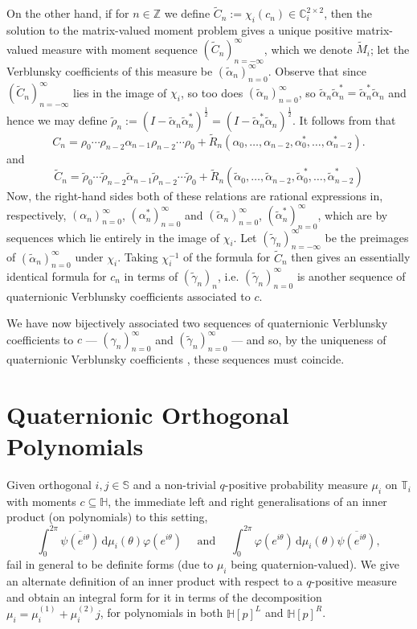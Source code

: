 \documentclass[11pt,reqno]{amsart}
\def\a{\alpha}
\def\x{\chi}
\def\p{\varphi}
\def\q{\psi}
\def\g{\gamma}
\def\r{\rho}
\def\th{\theta}
\def\rmd{\mathrm{d}}
\def\ZZ{\mathbb{Z}}
\def\CC{\mathbb{C}}
\def\SS{\mathbb{S}}
\def\TT{\mathbb{T}}
\def\HH{\mathbb{H}}
\theoremstyle{definition}
\numberwithin{equation}{section}
\renewcommand{\tilde}{\widetilde}
\begin{document}
On the other hand, if for \(n\in\ZZ\) we define \(\tilde{C}_n := \x_i(c_n) \in \CC_i^{2\times 2}\), then the solution to the matrix-valued moment problem gives a unique positive matrix-valued measure with moment sequence \((\tilde{C}_n)_{n=-\infty}^{\infty}\), which we denote \(\tilde{M}_i\); let the Verblunsky coefficients of this measure be \((\tilde{\a}_n)_{n=0}^{\infty}\). Observe that since \((\tilde{C}_n)_{n=-\infty}^{\infty}\) lies in the image of \(\x_i\), so too does \((\tilde{\a}_n)_{n=0}^{\infty}\), so \(\tilde{\a}_n \tilde{\a}_n^* = \tilde{\a}_n^* \tilde{\a}_n\) and hence we may define \(\tilde{\r}_n := (I - \tilde{\a}_n \tilde{\a}_n^*)^{\frac12} = (I - \tilde{\a}_n^* \tilde{\a}_n)^{\frac12}\). It follows from  that
\[
    C_{n} = \r_0 \cdots \r_{n-2} \a_{n-1} \r_{n-2} \cdots \r_0 + \tilde{R}_{n}(\a_0, \ldots, \a_{n-2}, \a_0^*, \ldots, \a_{n-2}^*).
\]
and
\[
    \tilde{C}_n = \tilde{\r}_0 \cdots \tilde{\r}_{n-2} \tilde{\a}_{n-1} \tilde{\r}_{n-2} \cdots \tilde{\r}_0 + \tilde{R}_{n}(\tilde{\a}_0, \ldots, \tilde{\a}_{n-2}, \tilde{\a}_0^*, \ldots, \tilde{\a}_{n-2}^*)
\]
Now, the right-hand sides both of these relations are rational expressions in, respectively, \((\a_n)_{n=0}^{\infty}\), \((\a_n^*)_{n=0}^{\infty}\) and \((\tilde{\a}_n)_{n=0}^{\infty}\), \((\tilde{\a}_n^*)_{n=0}^{\infty}\), which are by  sequences which lie entirely in the image of \(\x_i\). Let \((\tilde{\g}_n)_{n=-\infty}^{\infty}\) be the preimages of \((\tilde{\a}_n)_{n=0}^{\infty}\) under \(\x_i\). Taking \(\x_i^{-1}\) of the formula for \(\tilde{C}_n\) then gives an essentially identical formula for \(c_n\) in terms of \((\tilde{\g}_n)_n\), i.e. \((\tilde{\g}_n)_{n=0}^{\infty}\) is another sequence of quaternionic Verblunsky coefficients associated to \(c\).

We have now bijectively associated two sequences of quaternionic Verblunsky coefficients to \(c\) --- \((\g_n)_{n=0}^{\infty}\) and \((\tilde{\g}_n)_{n=0}^{\infty}\) --- and so, by the uniqueness of quaternionic Verblunsky coefficients \cite{ACS16a}, these sequences must coincide.

\section{Quaternionic Orthogonal Polynomials}

Given orthogonal \(i,j \in \SS\) and a non-trivial \(q\)-positive probability measure \(\mu_i\) on \(\TT_i\) with moments \(c \subseteq \HH\), the immediate left and right generalisations of an inner product (on polynomials) to this setting,
\[
    \int_0^{2\pi} \overline{\q(e^{i\th})} \, \rmd \mu_i(\th) \p(e^{i\th}) \quad \text{ and } \quad \int_0^{2\pi} \p(e^{i\th}) \, \rmd \mu_i(\th) \overline{\q(e^{i\th})},
\]
fail in general to be definite forms (due to \(\mu_i\) being quaternion-valued). We give an alternate definition of an inner product with respect to a \(q\)-positive measure and obtain an integral form for it in terms of the decomposition \(\mu_i = \mu_i^{(1)} + \mu_i^{(2)}j\), for polynomials in both \(\HH[p]^L\) and \(\HH[p]^R\).
\end{document}
